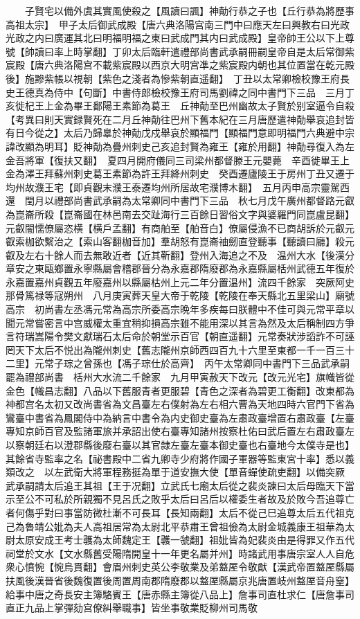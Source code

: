 　　子賢宅以備外虞其實風使殺之【風讀曰諷】神勣行恭之子也【丘行恭為將歷事高祖太宗】　甲子太后御武成殿【唐六典洛陽宫南三門中曰應天左曰興教右曰光政光政之内曰廣運其北曰明福明福之東曰武成門其内曰武成殿】皇帝帥王公以下上尊號【帥讀曰率上時掌翻】丁卯太后臨軒遣禮部尚書武承嗣冊嗣皇帝自是太后常御紫宸殿【唐六典洛陽宫不載紫宸殿以西京大明宫凖之紫宸殿内朝也其位置當在乾元殿後】施黲紫帳以視朝【紫色之淺者為慘紫朝直遥翻】　丁丑以太常卿檢校豫王府長史王德真為侍中【句斷】中書侍郎檢校豫王府司馬劉禕之同中書門下三品　三月丁亥徙杞王上金為畢王鄱陽王素節為葛王　丘神勣至巴州幽故太子賢於别室逼令自殺　【考異曰則天實録賢死在二月丘神勣往巴州下舊本紀在三月唐歷遣神勣舉哀追封皆有日今從之】太后乃歸辠於神勣戊戍舉哀於顯福門【顯福門意即明福門六典避中宗諱改顯為明耳】貶神勣為疊州刺史己亥追封賢為雍王【雍於用翻】神勣尋復入為左金吾將軍【復扶又翻】　夏四月開府儀同三司梁州都督滕王元嬰薨　辛酉徙畢王上金為澤王拜蘇州刺史葛王素節為許王拜絳州刺史　癸酉遷廬陵王于房州丁丑又遷于均州故濮王宅【即貞觀末濮王泰遷均州所居故宅濮博木翻】　五月丙申高宗靈駕西還　閏月以禮部尚書武承嗣為太常卿同中書門下三品　秋七月戊午廣州都督路元叡為崑崙所殺【崑崙國在林邑南去交趾海行三百餘日習俗文字與婆羅門同崑盧昆翻】元叡闇懦僚屬恣横【横戶孟翻】有商舶至【舶音白】僚屬侵漁不已商胡訴於元叡元叡索枷欲繫治之【索山客翻枷音加】羣胡怒有崑崙䄂劒直登聽事【聽讀曰廳】殺元叡及左右十餘人而去無敢近者【近其靳翻】登州入海追之不及　温州大水【後漢分章安之東甌鄉置永寧縣屬會稽郡晉分為永嘉郡隋廢郡為永嘉縣屬栝州武德五年復於永嘉置嘉州貞觀五年廢嘉州以縣屬枯州上元二年分置温州】流四千餘家　突厥阿史那骨篤禄等寇朔州　八月庚寅葬天皇大帝于乾陵【乾陵在奉天縣北五里梁山】廟號高宗　初尚書左丞馮元常為高宗所委高宗晩年多疾每曰朕體中不佳可與元常平章以聞元常嘗密言中宫威權太重宜稍抑損高宗雖不能用深以其言為然及太后稱制四方爭言符瑞嵩陽令樊文獻瑞石太后命於朝堂示百官【朝直遥翻】元常奏狀涉謟詐不可誣罔天下太后不悦出為隴州刺史【舊志隴州京師西四百九十六里至東都一千一百三十二里】元常子琮之曾孫也【馮子琮仕於高齊】　丙午太常卿同中書門下三品武承嗣罷為禮部尚書　栝州大水流二千餘家　九月甲寅赦天下改元【改元光宅】旗幟皆從金色【幟昌志翻】八品以下舊服青者更服碧【青色之深者為碧更工衡翻】改東都為神都宫名太初又改尚書省為文昌臺左右僕射為左右相六曹為天地四時六官門下省為鸞臺中書省為鳳閣侍中為納言中書令為内史御史臺為左肅政臺增置右肅政臺【左臺專知京師百官及監諸軍旅并承詔出使右臺專知諸州按察杜佑曰武后置左右肅政臺左以察朝廷右以澄郡縣後廢右臺以其官隸左臺左臺本御史臺也右臺地今太僕寺是也】其餘省寺監率之名【祕書殿中二省九卿寺少府將作國子軍器等監東宮十率】悉以義類改之　以左武衛大將軍程務挺為單于道安撫大使【單音蟬使疏吏翻】以備突厥　武承嗣請太后追王其祖【王于况翻】立武氏七廟太后從之裴炎諫曰太后母臨天下當示至公不可私於所親獨不見呂氏之敗乎太后曰呂后以權委生者故及於敗今吾追尊亡者何傷乎對曰事當防微杜漸不可長耳【長知兩翻】太后不從己巳追尊太后五代祖克己為魯靖公妣為夫人高祖居常為太尉北平恭肅王曾祖儉為太尉金城義康王祖華為太尉太原安成王考士彠為太師魏定王【彠一虢翻】祖妣皆為妃裴炎由是得罪又作五代祠堂於文水【文水縣舊受陽隋開皇十一年更名屬并州】時諸武用事唐宗室人人自危衆心憤惋【惋烏貫翻】會眉州刺史英公李敬業及弟盩厔令敬猷【漢武帝置盩厔縣屬扶風後漢晉省後魏復置後周置周南郡隋廢郡以盩厔縣屬京兆唐置岐州盩厔音舟窒】給事中唐之奇長安主簿駱賓王【唐赤縣主簿從八品上】詹事司直杜求仁【唐詹事司直正九品上掌彈劾宫僚糾舉職事】皆坐事敬業貶柳州司馬敬
